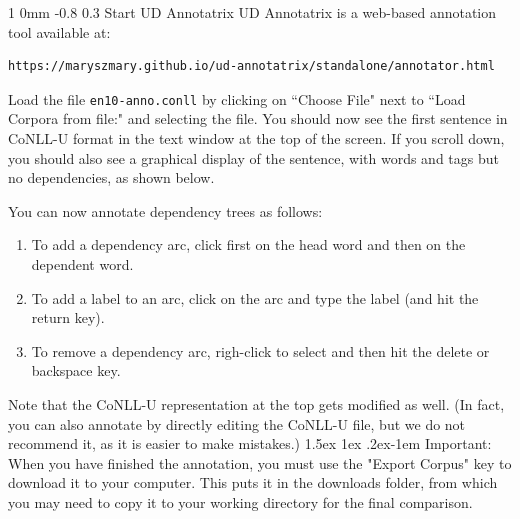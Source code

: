 \documentclass[10.9pt]{article}
\makeatletter
\newcommand{\newsec}[2]{\section{#1}\label{sec:#2}\noindent}
\renewcommand{\section}{\@startsection
{section}%
{1}%
{0mm}%
{-0.8\baselineskip}%
{0.3\baselineskip}%
{\bfseries\large}}%
\renewcommand{\paragraph}{%
  \@startsection{paragraph}{4}%
  {\z@}{1.5ex \@plus 1ex \@minus .2ex}{-1em}%
  {\normalfont\normalsize\bfseries}%
}\makeatother
\makeatother
\begin{document}
\newsec{Start UD Annotatrix}{brat}%
UD Annotatrix is a web-based annotation tool available at: 
\begin{verbatim}
https://maryszmary.github.io/ud-annotatrix/standalone/annotator.html
\end{verbatim}
Load the file {\tt en10-anno.conll} by clicking on ``Choose File" next to ``Load Corpora from file:" and selecting the file. 
You should now see the first sentence in CoNLL-U format in the text window at the top of the screen. 
If you scroll down, you should also see a graphical display of the sentence, with words and tags but no dependencies, as shown below.
\begin{center}
\end{center}
You can now annotate dependency trees as follows:
\begin{enumerate}[topsep=5pt,noitemsep]
\item To add a dependency arc, click first on the head word and then on the dependent word.
\item To add a label to an arc, click on the arc and type the label (and hit the return key).
\item To remove a dependency arc, righ-click to select and then hit the delete or backspace key.
\end{enumerate}
Note that the CoNLL-U representation at the top gets modified as well. (In fact, you can also annotate by directly editing the CoNLL-U file, but we do not recommend it, as it is easier to make mistakes.) \paragraph{Important:} When you have finished the annotation, you must use the "Export Corpus" key to download it to your computer. This puts it in the downloads folder, from which you may need to copy it to your working directory for the final comparison. 
\end{document}
